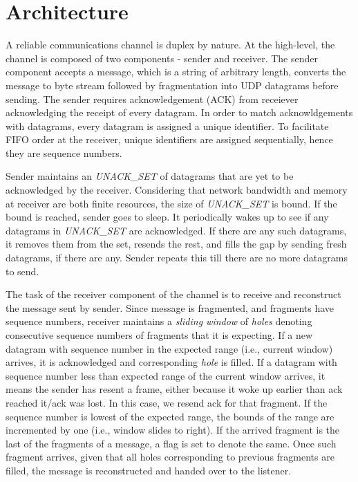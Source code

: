 \section{Architecture}
\label{sec:arch}

A reliable communications channel is duplex by nature. At the
high-level, the channel is composed of two components - sender and
receiver. The sender component accepts a message, which is a string of
arbitrary length, converts the message to byte stream followed by
fragmentation into UDP datagrams before sending. The sender requires
acknowledgement (ACK) from receiever acknowledging the receipt of
every datagram. In order to match acknowldgements with datagrams,
every datagram is assigned a unique identifier. To facilitate FIFO
order at the receiver, unique identifiers are assigned sequentially,
hence they are sequence numbers.

Sender maintains an \emph{UNACK\_SET} of datagrams that are yet to be
acknowledged by the receiver. Considering that network bandwidth and
memory at receiver are both finite resources, the size of
\emph{UNACK\_SET} is bound. If the bound is reached, sender goes to
sleep. It periodically wakes up to see if any datagrams in
\emph{UNACK\_SET} are acknowledged. If there are any such datagrams, it
removes them from the set, resends the rest, and fills the gap by
sending fresh datagrams, if there are any. Sender repeats this till
there are no more datagrams to send.

The task of the receiver component of the channel is to receive and
reconstruct the message sent by sender. Since message is fragmented,
and fragments have sequence numbers, receiver maintains a
\emph{sliding window} of \emph{holes} denoting consecutive sequence numbers
of fragments that it is expecting. If a new datagram with sequence
number in the expected range (i.e., current window) arrives, it is
acknowledged and corresponding \emph{hole} is filled. If a datagram with sequence number less
than expected range of the current window arrives, it means the sender has resent a frame, either because it woke up earlier than ack reached it/ack was lost. In this case, we resend ack for that fragment. If the sequence
number is lowest of the expected range, the bounds of the range are
incremented by one (i.e., window slides to right). If the arrived
fragment is the last of the fragments of a message, a flag is set to
denote the same. Once such fragment arrives, given that all holes
corresponding to previous fragments are filled, the message is
reconstructed and handed over to the listener.
